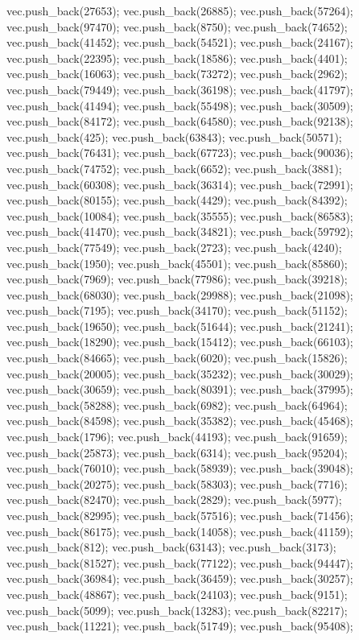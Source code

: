 vec.push_back(27653);
vec.push_back(26885);
vec.push_back(57264);
vec.push_back(97470);
vec.push_back(8750);
vec.push_back(74652);
vec.push_back(41452);
vec.push_back(54521);
vec.push_back(24167);
vec.push_back(22395);
vec.push_back(18586);
vec.push_back(4401);
vec.push_back(16063);
vec.push_back(73272);
vec.push_back(2962);
vec.push_back(79449);
vec.push_back(36198);
vec.push_back(41797);
vec.push_back(41494);
vec.push_back(55498);
vec.push_back(30509);
vec.push_back(84172);
vec.push_back(64580);
vec.push_back(92138);
vec.push_back(425);
vec.push_back(63843);
vec.push_back(50571);
vec.push_back(76431);
vec.push_back(67723);
vec.push_back(90036);
vec.push_back(74752);
vec.push_back(6652);
vec.push_back(3881);
vec.push_back(60308);
vec.push_back(36314);
vec.push_back(72991);
vec.push_back(80155);
vec.push_back(4429);
vec.push_back(84392);
vec.push_back(10084);
vec.push_back(35555);
vec.push_back(86583);
vec.push_back(41470);
vec.push_back(34821);
vec.push_back(59792);
vec.push_back(77549);
vec.push_back(2723);
vec.push_back(4240);
vec.push_back(1950);
vec.push_back(45501);
vec.push_back(85860);
vec.push_back(7969);
vec.push_back(77986);
vec.push_back(39218);
vec.push_back(68030);
vec.push_back(29988);
vec.push_back(21098);
vec.push_back(7195);
vec.push_back(34170);
vec.push_back(51152);
vec.push_back(19650);
vec.push_back(51644);
vec.push_back(21241);
vec.push_back(18290);
vec.push_back(15412);
vec.push_back(66103);
vec.push_back(84665);
vec.push_back(6020);
vec.push_back(15826);
vec.push_back(20005);
vec.push_back(35232);
vec.push_back(30029);
vec.push_back(30659);
vec.push_back(80391);
vec.push_back(37995);
vec.push_back(58288);
vec.push_back(6982);
vec.push_back(64964);
vec.push_back(84598);
vec.push_back(35382);
vec.push_back(45468);
vec.push_back(1796);
vec.push_back(44193);
vec.push_back(91659);
vec.push_back(25873);
vec.push_back(6314);
vec.push_back(95204);
vec.push_back(76010);
vec.push_back(58939);
vec.push_back(39048);
vec.push_back(20275);
vec.push_back(58303);
vec.push_back(7716);
vec.push_back(82470);
vec.push_back(2829);
vec.push_back(5977);
vec.push_back(82995);
vec.push_back(57516);
vec.push_back(71456);
vec.push_back(86175);
vec.push_back(14058);
vec.push_back(41159);
vec.push_back(812);
vec.push_back(63143);
vec.push_back(3173);
vec.push_back(81527);
vec.push_back(77122);
vec.push_back(94447);
vec.push_back(36984);
vec.push_back(36459);
vec.push_back(30257);
vec.push_back(48867);
vec.push_back(24103);
vec.push_back(9151);
vec.push_back(5099);
vec.push_back(13283);
vec.push_back(82217);
vec.push_back(11221);
vec.push_back(51749);
vec.push_back(95408);
